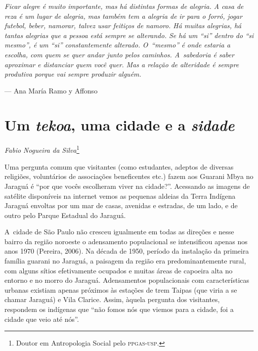 \clearpage

\vspace*{\fill}

\begin{flushright}
\begin{minipage}[c]{0.85\textwidth}
\raggedleft
\footnotesize
\emph{Ficar alegre é muito importante, mas há distintas formas de alegria. A
casa de reza é um lugar de alegria, mas também tem a alegria de ir para
o forró, jogar futebol, beber, namorar, talvez usar feitiços de namoro.
Há muitas alegrias, há tantas alegrias que a pessoa está sempre se
alterando. Se há um ``si'' dentro do ``si mesmo'', é um ``si'' constantemente
alterado. O~``mesmo'' é onde estaria a escolha, com quem se quer andar
junto pelos caminhos. A~sabedoria é saber aproximar e distanciar quem
você quer. Mas a relação de alteridade é sempre produtiva porque vai
sempre produzir alguém.}

\smallskip
\hspace*{\fill}--- Ana María Ramo y Affonso
\end{minipage}
\end{flushright}

\thispagestyle{empty}

\chapter*{Um \emph{tekoa}, uma cidade e a \emph{sidade}}


\begin{flushright}
\emph{Fabio Nogueira da Silva}\footnote{Doutor em Antropologia Social pelo
\textsc{ppgas}-\textsc{usp}.}
\end{flushright}
\bigskip

\noindent Uma pergunta comum que visitantes (como estudantes, adeptos de diversas
religiões, voluntários de associações beneficentes etc.) fazem aos
Guarani Mbya no Jaraguá é ``por que vocês escolheram viver na cidade?''.
Acessando as imagens de satélite disponíveis na internet vemos as
pequenas aldeias da Terra Indígena Jaraguá envoltas por um mar de
casas, avenidas e estradas, de um lado, e de outro pelo Parque Estadual
do Jaraguá. 

A~cidade de São Paulo não cresceu igualmente em todas as direções e
nesse bairro da região noroeste o adensamento populacional se
intensificou apenas nos anos 1970 (Pereira, 2006). Na década de 1950,
período da instalação da primeira família guarani no Jaraguá, a
paisagem da região era predominantemente rural, com alguns sítios
efetivamente ocupados e muitas áreas de capoeira alta no entorno e no
morro do Jaraguá. Adensamentos populacionais com características
urbanas existiam apenas próximos às estações de trem Taipas (que viria
a se chamar Jaraguá) e Vila Clarice. Assim, àquela pergunta dos
visitantes, respondem os indígenas que ``não fomos nós que viemos para a
cidade, foi a cidade que veio até nós''. 

